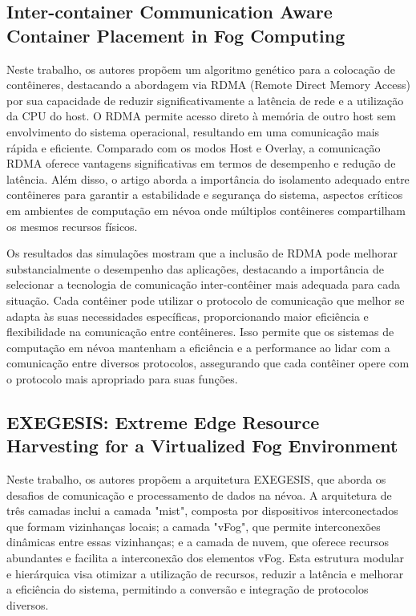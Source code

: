 \subsection{Inter-container Communication Aware Container Placement in Fog Computing}

Neste trabalho, os autores propõem um algoritmo genético para a colocação de contêineres, destacando a abordagem via RDMA (Remote Direct Memory Access) por sua capacidade de reduzir significativamente a latência de rede e a utilização da CPU do host. O RDMA permite acesso direto à memória de outro host sem envolvimento do sistema operacional, resultando em uma comunicação mais rápida e eficiente. Comparado com os modos Host e Overlay, a comunicação RDMA oferece vantagens significativas em termos de desempenho e redução de latência. Além disso, o artigo aborda a importância do isolamento adequado entre contêineres para garantir a estabilidade e segurança do sistema, aspectos críticos em ambientes de computação em névoa onde múltiplos contêineres compartilham os mesmos recursos físicos.

Os resultados das simulações mostram que a inclusão de RDMA pode melhorar substancialmente o desempenho das aplicações, destacando a importância de selecionar a tecnologia de comunicação inter-contêiner mais adequada para cada situação. Cada contêiner pode utilizar o protocolo de comunicação que melhor se adapta às suas necessidades específicas, proporcionando maior eficiência e flexibilidade na comunicação entre contêineres. Isso permite que os sistemas de computação em névoa mantenham a eficiência e a performance ao lidar com a comunicação entre diversos protocolos, assegurando que cada contêiner opere com o protocolo mais apropriado para suas funções.

\subsection{EXEGESIS: Extreme Edge Resource Harvesting for a Virtualized Fog Environment}

Neste trabalho, os autores propõem a arquitetura EXEGESIS, que aborda os desafios de comunicação e processamento de dados na névoa. A arquitetura de três camadas inclui a camada "mist", composta por dispositivos interconectados que formam vizinhanças locais; a camada "vFog", que permite interconexões dinâmicas entre essas vizinhanças; e a camada de nuvem, que oferece recursos abundantes e facilita a interconexão dos elementos vFog. Esta estrutura modular e hierárquica visa otimizar a utilização de recursos, reduzir a latência e melhorar a eficiência do sistema, permitindo a conversão e integração de protocolos diversos.

